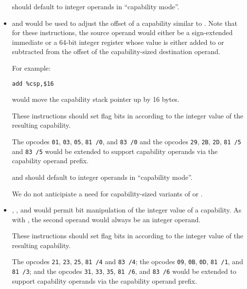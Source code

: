 \begin{itemize}
     should default to integer operands in
    ``capability mode''.

  \item {} and  would be used to adjust
    the offset of a capability similar to .  Note
    that for these instructions, the source operand would either be a
    sign-extended immediate or a 64-bit integer register whose value
    is either added to or subtracted from the offset of the
    capability-sized destination operand.

    For example:
 
\begin{verbatim}
add %csp,$16
\end{verbatim}

    would move the capability stack pointer up by 16 bytes.

    These instructions should set flag bits in \RFLAGS{} according to
    the integer value of the resulting capability.

    The  opcodes \texttt{01}, \texttt{03}, \texttt{05},
    \texttt{81 /0}, and \texttt{83 /0} and the 
    opcodes \texttt{29}, \texttt{2B}, \texttt{2D}, \texttt{81 /5} and
    \texttt{83 /5} would be extended to support capability operands
    via the capability operand prefix.

     and  should default to integer
    operands in ``capability mode''.

    We do not anticipiate a need for capability-sized variants of
     or .

  \item {}, , and  would
    permit bit manipulation of the integer value of a capability.  As
    with , the second operand would always be an
    integer operand.

    These instructions should set flag bits in \RFLAGS{} according to
    the integer value of the resulting capability.

    The  opcodes \texttt{21}, \texttt{23}, \texttt{25},
    \texttt{81 /4} and \texttt{83 /4}; the  opcodes
    \texttt{09}, \texttt{0B}, \texttt{0D}, \texttt{81 /1}, and
    \texttt{81 /3}; and the  opcodes \texttt{31},
    \texttt{33}, \texttt{35}, \texttt{81 /6}, and \texttt{83 /6} would
    be extended to support capability operands via the capability
    operand prefix.


\end{itemize}
